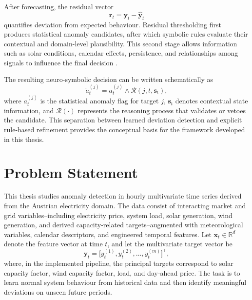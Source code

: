 After forecasting, the residual vector
\begin{equation}
\mathbf{r}_t = \mathbf{y}_t - \hat{\mathbf{y}}_t
\label{eq:intro_residual}
\end{equation}
quantifies deviation from expected behaviour. Residual thresholding first produces
statistical anomaly candidates, after which symbolic rules evaluate their contextual
and domain-level plausibility. This second stage allows information such as solar
conditions, calendar effects, persistence, and relationships among signals to
influence the final decision
\cite{gelfond1988stable,gebser2012answer,gebser2019multi}.

The resulting neuro-symbolic decision can be written schematically as
\begin{equation}
\tilde{a}_{t}^{(j)} = a_{t}^{(j)} \wedge \mathcal{R}\!\left(j,t,\mathbf{s}_t\right),
\label{eq:intro_neurosymbolic}
\end{equation}
where $a_{t}^{(j)}$ is the statistical anomaly flag for target $j$,
$\mathbf{s}_t$ denotes contextual state information, and $\mathcal{R}(\cdot)$
represents the reasoning process that validates or vetoes the candidate. This
separation between learned deviation detection and explicit rule-based refinement
provides the conceptual basis for the framework developed in this thesis.

\section{Problem Statement}

This thesis studies anomaly detection in hourly multivariate time series derived from the Austrian electricity domain. The data consist of interacting market and grid variables--including electricity price, system load, solar generation, wind generation, and derived capacity-related targets--augmented with meteorological variables, calendar descriptors, and engineered temporal features. Let $\mathbf{x}_t \in \mathbb{R}^{d}$ denote the feature vector at time $t$, and let the multivariate target vector be
\begin{equation}
\mathbf{y}_t = \bigl[y_t^{(1)}, y_t^{(2)}, \dots, y_t^{(m)}\bigr]^{\top},
\end{equation}
where, in the implemented pipeline, the principal targets correspond to solar capacity factor, wind capacity factor, load, and day-ahead price. The task is to learn normal system behaviour from historical data and then identify meaningful deviations on unseen future periods.

